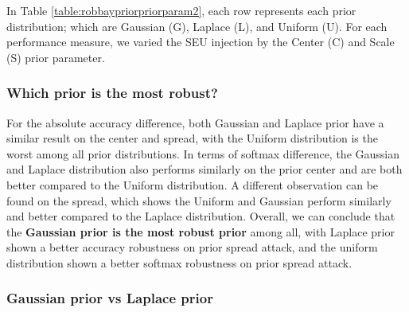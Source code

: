 In Table \ref{table:robbaypriorpriorparam2}, each row represents each prior distribution; which are Gaussian (G), Laplace (L), and Uniform (U). For each performance measure, we varied the SEU injection by the Center (C) and Scale (S) prior parameter.

\subsubsection{Which prior is the most robust?}

For the absolute accuracy difference, both Gaussian and Laplace prior have a similar result on the center and spread, with the Uniform distribution is the worst among all prior distributions. In terms of softmax difference, the Gaussian and Laplace distribution also performs similarly on the prior center and are both better compared to the Uniform distribution. A different observation can be found on the spread, which shows the Uniform and Gaussian perform similarly and better compared to the Laplace distribution. Overall, we can conclude that the \textbf{Gaussian prior is the most robust prior} among all, with Laplace prior shown a better accuracy robustness on prior spread attack, and the uniform distribution shown a better softmax robustness on prior spread attack.

\subsubsection{Gaussian prior vs Laplace prior}




